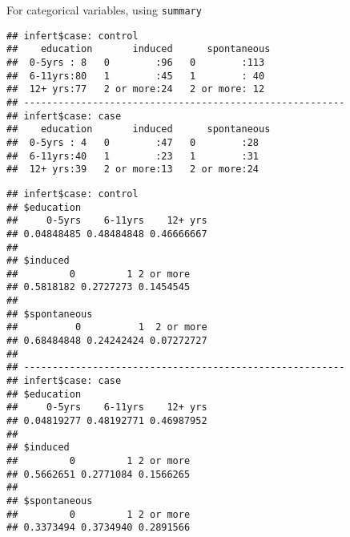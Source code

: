 \documentclass[]{book}
\newenvironment{Shaded}{\begin{snugshade}}{\end{snugshade}}
\newcommand{\KeywordTok}[1]{\textcolor[rgb]{0.13,0.29,0.53}{\textbf{{#1}}}}
\newcommand{\DecValTok}[1]{\textcolor[rgb]{0.00,0.00,0.81}{{#1}}}
\newcommand{\StringTok}[1]{\textcolor[rgb]{0.31,0.60,0.02}{{#1}}}
\newcommand{\NormalTok}[1]{{#1}}
\theoremstyle{definition}
\theoremstyle{definition}
\theoremstyle{remark}
\begin{document}
For categorical variables, using \texttt{summary}

\begin{Shaded}
\end{Shaded}

\begin{verbatim}
## infert$case: control
##    education       induced      spontaneous 
##  0-5yrs : 8   0        :96   0        :113  
##  6-11yrs:80   1        :45   1        : 40  
##  12+ yrs:77   2 or more:24   2 or more: 12  
## -------------------------------------------------------- 
## infert$case: case
##    education       induced      spontaneous
##  0-5yrs : 4   0        :47   0        :28  
##  6-11yrs:40   1        :23   1        :31  
##  12+ yrs:39   2 or more:13   2 or more:24
\end{verbatim}

\begin{Shaded}
\end{Shaded}

\begin{verbatim}
## infert$case: control
## $education
##     0-5yrs    6-11yrs    12+ yrs 
## 0.04848485 0.48484848 0.46666667 
## 
## $induced
##         0         1 2 or more 
## 0.5818182 0.2727273 0.1454545 
## 
## $spontaneous
##          0          1  2 or more 
## 0.68484848 0.24242424 0.07272727 
## 
## -------------------------------------------------------- 
## infert$case: case
## $education
##     0-5yrs    6-11yrs    12+ yrs 
## 0.04819277 0.48192771 0.46987952 
## 
## $induced
##         0         1 2 or more 
## 0.5662651 0.2771084 0.1566265 
## 
## $spontaneous
##         0         1 2 or more 
## 0.3373494 0.3734940 0.2891566
\end{verbatim}

\begin{Shaded}
\end{Shaded}
\end{document}
